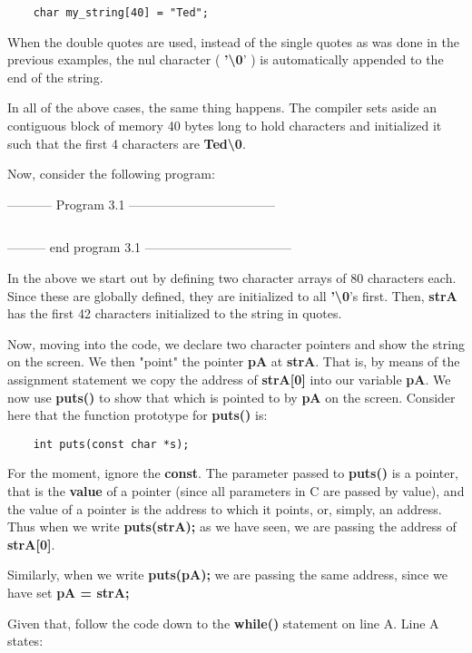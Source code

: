 \begin{verbatim}
    char my_string[40] = "Ted";
\end{verbatim}

When the double quotes are used, instead of the single quotes as was
done in the previous examples, the nul character (
\textbf{'\textbackslash0}' ) is automatically appended to the end of the
string.

In all of the above cases, the same thing happens. The compiler sets
aside an contiguous block of memory 40 bytes long to hold characters and
initialized it such that the first 4 characters are
\textbf{Ted\textbackslash0}.

Now, consider the following program:

-----------  Program 3.1  -----------------------------------
\inputminted[breaklines]{c}{../src/ch3-1.c}
--------- end program 3.1 -----------------------------------


In the above we start out by defining two character arrays of 80
characters each. Since these are globally defined, they are initialized
to all \textbf{'\textbackslash0}'s first. Then, \textbf{strA} has the
first 42 characters initialized to the string in quotes.

Now, moving into the code, we declare two character pointers and show
the string on the screen. We then "point" the pointer \textbf{pA} at
\textbf{strA}. That is, by means of the assignment statement we copy the
address of \textbf{strA{[}0{]}} into our variable \textbf{pA}. We now
use \textbf{puts()} to show that which is pointed to by \textbf{pA} on
the screen. Consider here that the function prototype for
\textbf{puts()} is:

\begin{verbatim}
    int puts(const char *s); 
\end{verbatim}

For the moment, ignore the \textbf{const}. The parameter passed to
\textbf{puts()} is a pointer, that is the \textbf{value} of a pointer
(since all parameters in C are passed by value), and the value of a
pointer is the address to which it points, or, simply, an address. Thus
when we write \textbf{puts(strA);} as we have seen, we are passing the
address of \textbf{strA{[}0{]}}.

Similarly, when we write \textbf{puts(pA);} we are passing the same
address, since we have set \textbf{pA = strA;}

Given that, follow the code down to the \textbf{while()} statement on
line A. Line A states:

